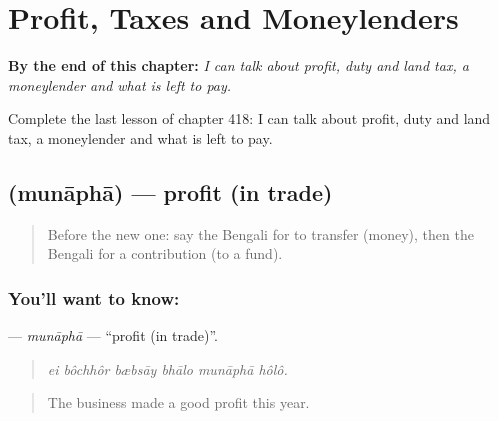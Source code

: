 
\chapter{Profit, Taxes and Moneylenders}
\label{ch:bn-profit-taxes-and-moneylenders}

\begin{chapteropening}
\textbf{By the end of this chapter:} \emph{I can talk about profit, duty and land tax, a moneylender and what is left to pay.}

Complete the last lesson of chapter 418: I can talk about profit, duty and land tax, a moneylender and what is left to pay.
\end{chapteropening}

\section[\texorpdfstring{\bn{মুনাফা} (munāphā)}{মুনাফা (munāphā)}]{ (munāphā) — profit (in trade)}

\label{lesson:BN-C418-munapha}



\begin{quote}
Before the new one: say the Bengali for to transfer (money), then the Bengali for a contribution (to a fund).
\end{quote}

\subsection*{You'll want to know: }
\textbf{} — \emph{munāphā} — \textquotedblleft{}profit (in trade)\textquotedblright{}.

\begin{quote}
     
\end{quote}

\begin{quote}
\emph{ei bôchhôr bæbsāy bhālo munāphā hôlô.}
\end{quote}

\begin{quote}
The business made a good profit this year.
\end{quote}

